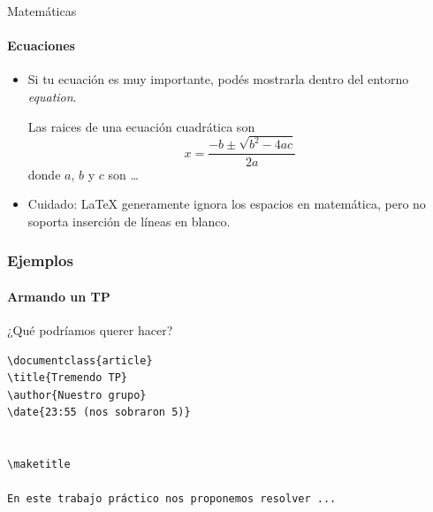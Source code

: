 \begin{frame}[fragile]{Matemáticas}
    \framesubtitle{Ecuaciones}
    \begin{itemize}
        \item Si tu ecuación es muy importante, podés mostrarla dentro del entorno \emph{equation}.

\vspace*{5pt}
        
\begin{exampletwouptiny}
Las raices de una ecuación cuadrática son
\begin{equation}
x = \frac{-b \pm \sqrt{b^2 - 4ac}}
            {2a}
\end{equation}
donde $a$, $b$ y $c$ son \ldots
\end{exampletwouptiny}

\vspace*{5pt}

\item Cuidado: \LaTeX{} generamente ignora los espacios en matemática, pero no soporta inserción de líneas en blanco.

    \end{itemize}
\end{frame}

\begin{frame}[fragile]
\frametitle{Ejemplos}
\framesubtitle{Armando un TP}

¿Qué podríamos querer hacer?

\begin{lstlisting}[title={segundoTP.tex}]
\documentclass{article}
\title{Tremendo TP}
\author{Nuestro grupo}
\date{23:55 (nos sobraron 5)}


\maketitle

En este trabajo práctico nos proponemos resolver ...


\end{lstlisting}

\end{frame}

